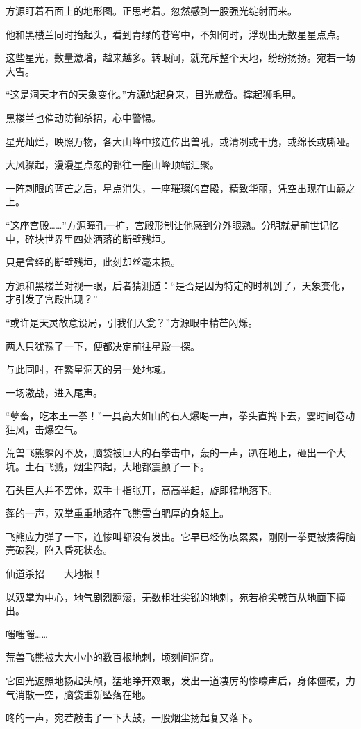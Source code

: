 \begin{this_body}
方源盯着石面上的地形图。正思考着。忽然感到一股强光绽射而来。

他和黑楼兰同时抬起头，看到青绿的苍穹中，不知何时，浮现出无数星星点点。

这些星光，数量激增，越来越多。转眼间，就充斥整个天地，纷纷扬扬。宛若一场大雪。

“这是洞天才有的天象变化。”方源站起身来，目光戒备。撑起狮毛甲。

黑楼兰也催动防御杀招，心中警惕。

星光灿烂，映照万物，各大山峰中接连传出兽吼，或清冽或干脆，或绵长或嘶哑。

大风骤起，漫漫星点忽的都往一座山峰顶端汇聚。

一阵刺眼的蓝芒之后，星点消失，一座璀璨的宫殿，精致华丽，凭空出现在山巅之上。

“这座宫殿……”方源瞳孔一扩，宫殿形制让他感到分外眼熟。分明就是前世记忆中，碎块世界里四处洒落的断壁残垣。

只是曾经的断壁残垣，此刻却丝毫未损。

方源和黑楼兰对视一眼，后者猜测道：“是否是因为特定的时机到了，天象变化，才引发了宫殿出现？”

“或许是天灵故意设局，引我们入瓮？”方源眼中精芒闪烁。

两人只犹豫了一下，便都决定前往星殿一探。

与此同时，在繁星洞天的另一处地域。

一场激战，进入尾声。

“孽畜，吃本王一拳！”一具高大如山的石人爆喝一声，拳头直捣下去，霎时间卷动狂风，击爆空气。

荒兽飞熊躲闪不及，脑袋被巨大的石拳击中，轰的一声，趴在地上，砸出一个大坑。土石飞溅，烟尘四起，大地都震颤了一下。

石头巨人并不罢休，双手十指张开，高高举起，旋即猛地落下。

蓬的一声，双掌重重地落在飞熊雪白肥厚的身躯上。

飞熊应力弹了一下，连惨叫都没有发出。它早已经伤痕累累，刚刚一拳更被揍得脑壳破裂，陷入昏死状态。

仙道杀招——大地根！

以双掌为中心，地气剧烈翻滚，无数粗壮尖锐的地刺，宛若枪尖戟首从地面下撞出。

嗤嗤嗤……

荒兽飞熊被大大小小的数百根地刺，顷刻间洞穿。

它回光返照地扬起头颅，猛地睁开双眼，发出一道凄厉的惨嚎声后，身体僵硬，力气消散一空，脑袋重新坠落在地。

咚的一声，宛若敲击了一下大鼓，一股烟尘扬起复又落下。


\end{this_body}
